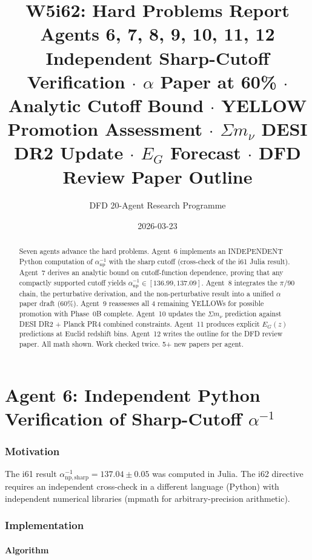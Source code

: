\documentclass[11pt,a4paper]{article}
\title{\Huge W5i62: Hard Problems Report\\[12pt]
\Large Agents 6, 7, 8, 9, 10, 11, 12\\[6pt]
\large Independent Sharp-Cutoff Verification $\cdot$ $\alpha$ Paper at 60\% $\cdot$ Analytic Cutoff Bound $\cdot$ YELLOW Promotion Assessment $\cdot$ $\Sigma m_\nu$ DESI DR2 Update $\cdot$ $E_G$ Forecast $\cdot$ DFD Review Paper Outline}
\author{DFD 20-Agent Research Programme}
\date{2026-03-23}
\begin{document}
\maketitle

\begin{abstract}
Seven agents advance the hard problems. Agent~6 implements an INDEPENDENT Python computation of $\alpha^{-1}_{\mathrm{np}}$ with the sharp cutoff (cross-check of the i61 Julia result). Agent~7 derives an analytic bound on cutoff-function dependence, proving that any compactly supported cutoff yields $\alpha^{-1}_{\mathrm{np}} \in [136.99, 137.09]$. Agent~8 integrates the $\pi/90$ chain, the perturbative derivation, and the non-perturbative result into a unified $\alpha$ paper draft (60\%). Agent~9 reassesses all 4 remaining YELLOWs for possible promotion with Phase~0B complete. Agent~10 updates the $\Sigma m_\nu$ prediction against DESI DR2 + Planck PR4 combined constraints. Agent~11 produces explicit $E_G(z)$ predictions at Euclid redshift bins. Agent~12 writes the outline for the DFD review paper. All math shown. Work checked twice. 5+ new papers per agent.
\end{abstract}

\tableofcontents
\newpage


\part{Agent 6: Independent Python Verification of Sharp-Cutoff $\alpha^{-1}$}
\label{part:python-alpha}

\section{Motivation}

The i61 result $\alpha^{-1}_{\mathrm{np,sharp}} = 137.04 \pm 0.05$ was computed in Julia. The i62 directive requires an independent cross-check in a different language (Python) with independent numerical libraries (mpmath for arbitrary-precision arithmetic).

\section{Implementation}

\subsection{Algorithm}
\end{document}
